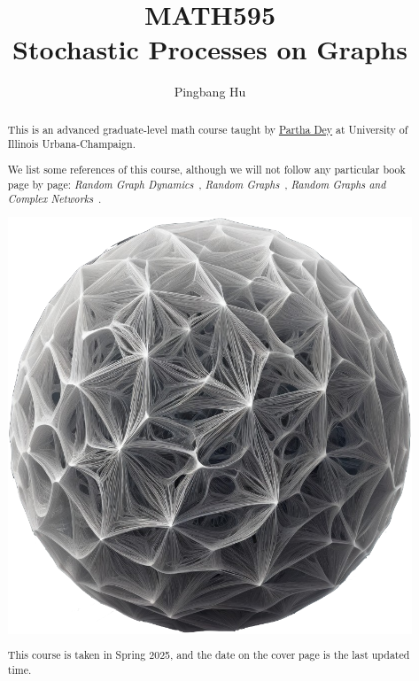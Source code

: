 \documentclass[a4paper]{report}
\author{Pingbang Hu}
\title{MATH595\\Stochastic Processes on Graphs}
\begin{document}
\maketitle

\begin{abstract}
	This is an advanced graduate-level math course taught by \href{https://psdey.web.illinois.edu/}{Partha Dey} at University of Illinois Urbana-Champaign.

	We list some references of this course, although we will not follow any particular book page by page: \emph{Random Graph Dynamics}~\cite{durrett2010random}, \emph{Random Graphs}~\cite{janson2011random}, \emph{Random Graphs and Complex Networks}~\cite{van2024random}.

	\vfill
	\begin{center}
		\includegraphics[width=.8\linewidth]{Figures/cover.png}
	\end{center}
	\vfill
	This course is taken in Spring 2025, and the date on the cover page is the last updated time.
\end{abstract}

\tableofcontents


\newpage
\appendix
\appendixpage{}



\newpage
\pagestyle{plain}
\printbibliography{}
\end{document}
